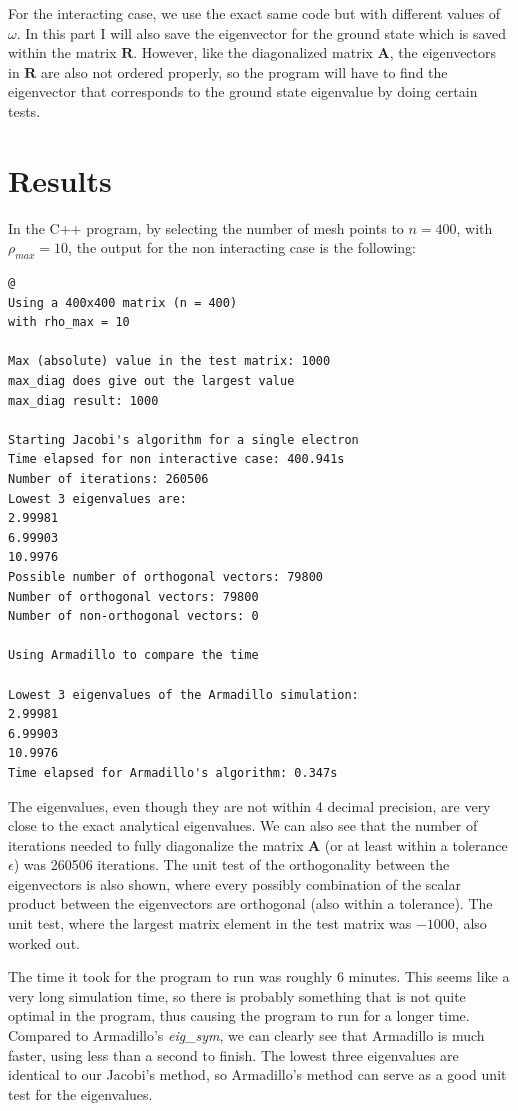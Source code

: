 \documentclass[12pt]{article}
\begin{document}
For the interacting case, we use the exact same code but with different values of $\omega$. In this part I will also save the eigenvector for the ground state which is saved within the matrix $\mathbf{R}$. However, like the diagonalized matrix $\mathbf{A}$, the eigenvectors in $\mathbf{R}$ are also not ordered properly, so the program will have to find the eigenvector that corresponds to the ground state eigenvalue by doing certain tests. 

\section{Results}
In the C++ program, by selecting the number of mesh points to $n=400$, with $\rho_{max} = 10$, the output for the non interacting case is the following:
\begin{lstlisting}
@
Using a 400x400 matrix (n = 400)
with rho_max = 10

Max (absolute) value in the test matrix: 1000
max_diag does give out the largest value
max_diag result: 1000 

Starting Jacobi's algorithm for a single electron
Time elapsed for non interactive case: 400.941s
Number of iterations: 260506
Lowest 3 eigenvalues are: 
2.99981
6.99903
10.9976
Possible number of orthogonal vectors: 79800
Number of orthogonal vectors: 79800
Number of non-orthogonal vectors: 0

Using Armadillo to compare the time

Lowest 3 eigenvalues of the Armadillo simulation: 
2.99981
6.99903
10.9976
Time elapsed for Armadillo's algorithm: 0.347s
\end{lstlisting}
The eigenvalues, even though they are not within 4 decimal precision, are very close to the exact analytical eigenvalues. We can also see that the number of iterations needed to fully diagonalize the matrix $\mathbf{A}$ (or at least within a tolerance $\epsilon$) was 260506 iterations. The unit test of the orthogonality between the eigenvectors is also shown, where every possibly combination of the scalar product between the eigenvectors are orthogonal (also within a tolerance). The unit test, where the largest matrix element in the test matrix was $-1000$, also worked out.

The time it took for the program to run was roughly 6 minutes. This seems like a very long simulation time, so there is probably something that is not quite optimal in the program, thus causing the program to run for a longer time. Compared to Armadillo's \emph{eig\_sym}, we can clearly see that Armadillo is much faster, using less than a second to finish. The lowest three eigenvalues are identical to our Jacobi's method, so Armadillo's method can serve as a good unit test for the eigenvalues.
\end{document}
